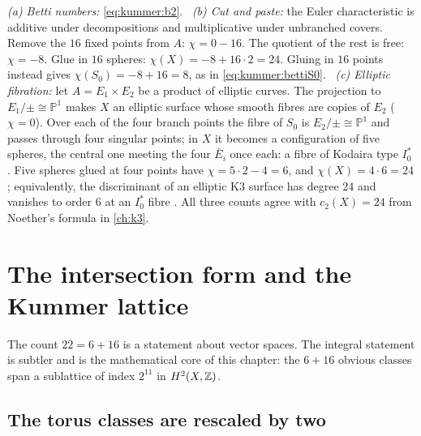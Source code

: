 \begin{example}\label{ex:kummer:24}
\emph{(a) Betti numbers:} \eqref{eq:kummer:b2}. \ \emph{(b) Cut and paste:} the Euler
characteristic is additive under decompositions and multiplicative under unbranched
covers. Remove the $16$ fixed points from $A$: $\chi=0-16$. The quotient of the rest is free:
$\chi=-8$. Glue in $16$ spheres: $\chi(X)=-8+16\cdot2=24$. Gluing in $16$ points instead gives
$\chi(S_0)=-8+16=8$, as in \eqref{eq:kummer:bettiS0}.
\ \emph{(c) Elliptic fibration:} let $A=E_1\times E_2$ be a product of elliptic curves. The
projection to $E_1/\pm\cong\mathbb{P}^1$ makes $X$ an elliptic surface whose smooth fibres
are copies of $E_2$ ($\chi=0$). Over each of the four branch points the fibre of
$S_0$ is $E_2/\pm\cong\mathbb{P}^1$ and passes through four singular points; in $X$ it becomes
a configuration of five spheres, the central one meeting the four $\bar E_i$ once each: a
fibre of Kodaira type $I_0^*$ . Five
spheres glued at four points have $\chi=5\cdot2-4=6$, and $\chi(X)=4\cdot6=24$; equivalently,
the discriminant of an elliptic K3 surface has degree $24$ and vanishes to order $6$ at an
$I_0^*$ fibre .
All three counts agree with $c_2(X)=24$ from Noether's formula in
\cref{ch:k3}.
\end{example}

\section{The intersection form and the Kummer lattice}\label{sec:kummer:lattice}

The count $22=6+16$ is a statement about vector spaces. The integral statement is subtler
and is the mathematical core of this chapter: the $6+16$ obvious classes span a sublattice of
index $2^{11}$ in $H^2(X,\mathbb{Z})$.

\subsection{The torus classes are rescaled by two}

